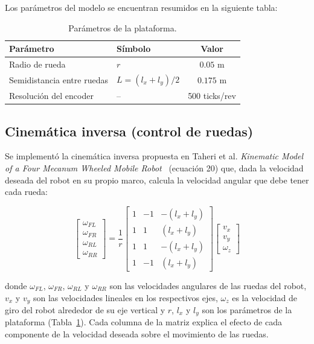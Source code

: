 \documentclass[11pt,a4paper]{article}
\begin{document}
Los parámetros del modelo se encuentran resumidos en la siguiente tabla: 

\begin{table}[htbp]
\centering
\begin{tabular}{llc}
\toprule
\textbf{Parámetro} & \textbf{Símbolo} & \textbf{Valor} \\
\midrule
Radio de rueda & $r$ & $0.05$ m \\
Semidistancia entre ruedas & $L = (l_x + l_y)/2$ & $0.175$ m \\
Resolución del encoder & -- & 500 ticks/rev \\
\bottomrule
\end{tabular}
\caption{Parámetros de la plataforma.}
\label{tab:parametros}
\end{table}

\subsection{Cinemática inversa (control de ruedas)}

Se implementó la cinemática inversa propuesta en Taheri et al. \emph{Kinematic Model of a Four Mecanum Wheeled Mobile Robot}~\cite{taheri2015} (ecuación 20) que, dada la velocidad deseada del robot en su propio marco, calcula la velocidad angular que debe tener cada rueda:

\begin{equation}
\begin{bmatrix}\omega_{FL}\\ \omega_{FR}\\ \omega_{RL}\\ \omega_{RR}\end{bmatrix}
= \frac{1}{r}
\begin{bmatrix}
1 & -1 & -(l_x+l_y)\\
1 & 1 & (l_x+l_y)\\
1 & 1 & -(l_x+l_y)\\
1 & -1 & (l_x+l_y)
\end{bmatrix}
\begin{bmatrix}v_x\\ v_y\\ \omega_z\end{bmatrix}
\label{eq:cin_inversa}
\end{equation}

donde $\omega_{FL}$, $\omega_{FR}$, $\omega_{RL}$ y $\omega_{RR}$ son las velocidades angulares de las ruedas del robot, $v_x$ y $v_y$ son las velocidades lineales en los respectivos ejes, $\omega_z$ es la velocidad de giro del robot alrededor de su eje vertical y $r$, $l_x$ y $l_y$ son los parámetros de la plataforma (Tabla~\ref{tab:parametros}). Cada columna de la matriz explica el efecto de cada componente de la velocidad deseada sobre el movimiento de las ruedas. 
\end{document}
